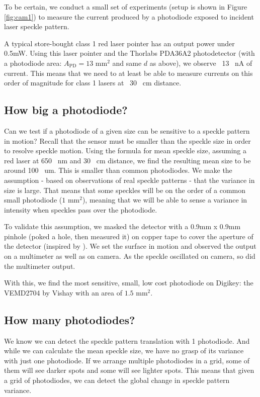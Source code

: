 To be certain, we conduct a small set of experiments (setup is shown in Figure \ref{fig:cam1}) to measure the current produced by a photodiode exposed to incident laser speckle pattern.

A typical store-bought class 1 red laser pointer has an output power under 0.5mW. 
Using this laser pointer and the Thorlabs PDA36A2 photodetector (with a photodiode area: $A_{\text{PD}} = 13\text{ mm}^2$ and same $d$ as above), we observe ~13 ~nA of current.
This means that we need to at least be able to measure currents on this order of magnitude for class 1 lasers at ~30 ~cm distance.


\subsection{How big a photodiode?}
Can we test if a photodiode of a given size can be sensitive to a speckle pattern in motion? Recall that the sensor must be smaller than the speckle size in order to resolve speckle motion. Using the formula for mean speckle size, assuming a red laser at 650 ~nm and 30 ~cm distance, we find the resulting mean size to be around 100 ~um. This is smaller than common photodiodes. We make the assumption - based on observations of real speckle patterns - that the variance in size is large. That means that some speckles will be on the order of a common small photodiode ($1\text{ mm}^2$), meaning that we will be able to sense a variance in intensity when speckles pass over the photodiode.

To validate this assumption, we masked the detector with a 0.9mm x 0.9mm pinhole (poked a hole, then measured it) on copper tape to cover the aperture of the detector (inspired by \cite{veber2011laserMASK}). 
We set the surface in motion and observed the output on a multimeter as well as on camera. As the speckle oscillated on camera, so did the multimeter output.

With this, we find the most sensitive, small, low cost photodiode on Digikey: the VEMD2704 by Vishay with an area of $1.5\text{ mm}^2$.

\subsection{How many photodiodes?}
We know we can detect the speckle pattern translation with 1 photodiode. And while we can calculate the mean speckle size, we have no grasp of its variance with just one photodiode. If we arrange multiple photodiodes in a grid, some of them will see darker spots and some will see lighter spots. This means that given a grid of photodiodes, we can detect the global change in speckle pattern variance. 

